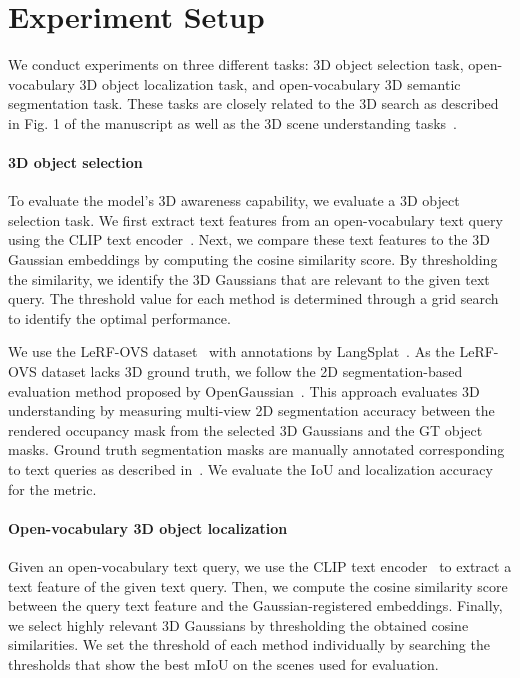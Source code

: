 \section{Experiment Setup}
\label{sec:exp_setup}

We conduct experiments on three different tasks: 3D object selection task, open-vocabulary 3D object localization task, and open-vocabulary 3D semantic segmentation task. These tasks are closely related to the 3D search as described in Fig. 1 of the manuscript as well as the 3D scene understanding tasks~\cite{open_gaussian}.

\paragraph{3D object selection}
To evaluate the model's 3D awareness capability, we evaluate a 3D object selection task. We first extract text features from an open-vocabulary text query using the CLIP text encoder~\cite{clip}. Next, we compare these text features to the 3D Gaussian embeddings by computing the cosine similarity score. By thresholding the similarity, we identify the 3D Gaussians that are relevant to the given text query. The threshold value for each method is determined through a grid search to identify the optimal performance.

We use the LeRF-OVS dataset~\cite{lerf} with annotations by LangSplat~\cite{langsplat}. As the LeRF-OVS dataset lacks 3D ground truth, we follow the 2D segmentation-based evaluation method proposed by OpenGaussian~\cite{open_gaussian}. This approach evaluates 3D understanding by measuring multi-view 2D segmentation accuracy between the rendered occupancy mask from the selected 3D Gaussians and the GT object masks. Ground truth segmentation masks are manually annotated corresponding to text queries as described in~\cite{langsplat}. We evaluate the IoU and localization accuracy for the metric.

\paragraph{Open-vocabulary 3D object localization}
Given an open-vocabulary text query, we use the CLIP text encoder~\cite{clip} to extract a text feature of the given text query. Then, we compute the cosine similarity score between the query text feature and the Gaussian-registered embeddings. Finally, we select highly relevant 3D Gaussians by thresholding the obtained cosine similarities. We set the threshold of each method individually by searching the thresholds that show the best mIoU on the scenes used for evaluation.


